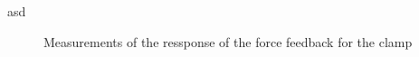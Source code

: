 \begin{minipage}{0.5\linewidth}
	asd
\end{minipage}
\begin{minipage}{0.5\linewidth}
\begin{figure}[H]
		\resizebox{0.5\textwidth}{!}{
 

}
 \caption{Measurements of the ressponse of the force feedback for the clamp}

\end{figure}
\end{minipage}